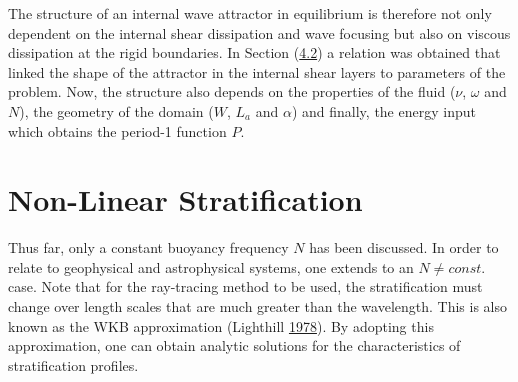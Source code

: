\documentclass[a4paper]{article}
\numberwithin{equation}{section}
\begin{document}
The structure of an internal wave attractor in equilibrium is therefore not only dependent on the internal shear dissipation and wave focusing but also on viscous dissipation at the rigid boundaries. In Section (\hyperref[sec:4.2]{4.2}) a relation was obtained that linked the shape of the attractor in the internal shear layers to parameters of the problem. Now, the structure also depends on the properties of the fluid ($\nu$, $\omega$ and $N$), the geometry of the domain ($W$, $L_a$ and $\alpha$) and finally, the energy input which obtains the period-1 function $P$.

\section{Non-Linear Stratification}
\label{sec:5}
Thus far, only a constant buoyancy frequency $N$ has been discussed. In order to relate to geophysical and astrophysical systems, one extends to an $N \neq const.$ case. Note that for the ray-tracing method to be used, the stratification must change over length scales that are much greater than the wavelength. This is also known as the WKB approximation (Lighthill \hyperlink{ref 31}{1978}). By adopting this approximation, one can obtain analytic solutions for the characteristics of stratification profiles. 
\end{document}
